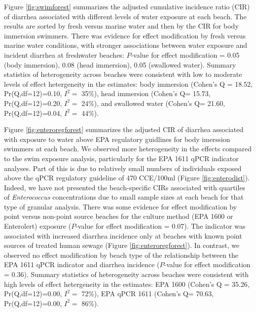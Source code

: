 \documentclass[12pt]{article}\usepackage[]{graphicx}\usepackage[]{color}
\begin{document}
Figure \ref{fig:swimforest} summarizes the adjusted cumulative incidence ratio (CIR) of diarrhea associated with different levels of water exposure at each beach.  The results are sorted by fresh versus marine water and then by the CIR for body immersion swimmers. There was evidence for effect modification by fresh versus marine water conditions, with stronger associations between water exposure and incident diarrhea at freshwater beaches: $P$-value for effect modification = 0.05 (body immersion), 0.08 (head immersion), 0.05 (swallowed water). Summary statistics of heterogeneity across beaches\supercite{Higgins2002-vr, Higgins2003-bh} were consistent with low to moderate levels of effect hetergeneity in the estimates: body immersion (Cohen's Q =
18.52, 
Pr(Q,df=12)=0.10,
$I^2=$ 35\%),
 head immersion (Cohen's Q=
 15.73, 
Pr(Q,df=12)=0.20,
$I^2=$ 24\%),
 and swallowed water (Cohen's Q=
 21.60, 
Pr(Q,df=12)=0.04,
$I^2=$ 44\%).


Figure \ref{fig:enteroregforest} summarizes the adjusted CIR of diarrhea associated with exposure to water above EPA regulatory guidlines for body imerssion swimmers at each beach.  We observed more heterogeneity in the effects compared to the swim exposure analysis, particularly for the EPA 1611 qPCR indicator analyses.  Part of this is due to relatively small numbers of individuals exposed above the qPCR regulatory guideline of 470 CCE/100ml (Figure \ref{fig:enterodist}). Indeed, we have not presented the beach-specific CIRs associated with quartiles of \emph{Enterococcus} concentrations due to small sample sizes at each beach for that type of granular analysis. There was some evidence for effect modification by point versus non-point source beaches for the culture method (EPA 1600 or Enterolert) exposure ($P$-value for effect modification = 0.07). The indicator was associated with increased diarrhea incidence only at beaches with known point sources of treated human sewage (Figure \ref{fig:enteroregforest}). In contrast, we observed no effect modification by beach type of the relationship between the EPA 1611 qPCR indicator and diarrhea incidence ($P$-value for effect modification = 0.36). Summary statistics of heterogeneity across beaches\supercite{Higgins2002-vr, Higgins2003-bh} were consistent with high levels of effect hetergeneity in the estimates: EPA 1600 (Cohen's Q =
35.26, 
Pr(Q,df=12)=0.00,
$I^2=$ 72\%),
 EPA qPCR 1611 (Cohen's Q=
 70.63, 
Pr(Q,df=12)=0.00,
$I^2=$ 86\%).
\end{document}
